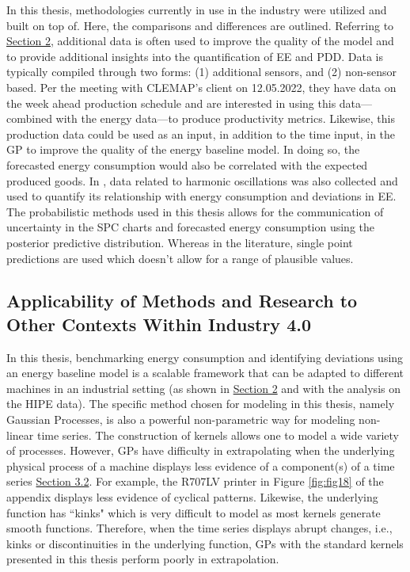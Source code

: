 In this thesis, methodologies currently in use in the industry were utilized and built on top of. Here, the comparisons and differences are outlined. Referring to \hyperlink{section.2}{Section 2}, additional data is often used to improve the quality of the model and to provide additional insights into the quantification of EE and PDD. Data is typically compiled through two forms: (1) additional sensors, and (2) non-sensor based. Per the meeting with CLEMAP's client on 12.05.2022, they have data on the week ahead production schedule and are interested in using this data—combined with the energy data—to produce productivity metrics. Likewise, this production data could be used as an input, in addition to the time input, in the GP to improve the quality of the energy baseline model. In doing so, the forecasted energy consumption would also be correlated with the expected produced goods. In \cite{HIPE} \cite{boiler} \cite{gas-turbine-faults}, data related to harmonic oscillations was also collected and used to quantify its relationship with energy consumption and deviations in EE. The probabilistic methods used in this thesis allows for the communication of uncertainty in the SPC charts and forecasted energy consumption using the posterior predictive distribution. Whereas in the literature, single point predictions are used which doesn't allow for a range of plausible values. 

\subsection{Applicability of Methods and Research to Other Contexts Within Industry 4.0}

In this thesis, benchmarking energy consumption and identifying deviations using an energy baseline model is a scalable framework that can be adapted to different machines in an industrial setting (as shown in \hyperlink{section.2}{Section 2} and with the analysis on the HIPE data). The specific method chosen for modeling in this thesis, namely Gaussian Processes, is also a powerful non-parametric way for modeling non-linear time series. The construction of kernels allows one to model a wide variety of processes. However, GPs have difficulty in extrapolating when the underlying physical process of a machine displays less evidence of a component(s) of a time series \hyperlink{subsection.3.2}{Section 3.2}. For example, the R707LV printer in Figure \ref{fig:fig18} of the appendix displays less evidence of cyclical patterns. Likewise, the underlying function has ``kinks" which is very difficult to model as most kernels generate smooth functions. Therefore, when the time series displays abrupt changes, i.e., kinks or discontinuities in the underlying function, GPs with the standard kernels presented in this thesis perform poorly in extrapolation. 

